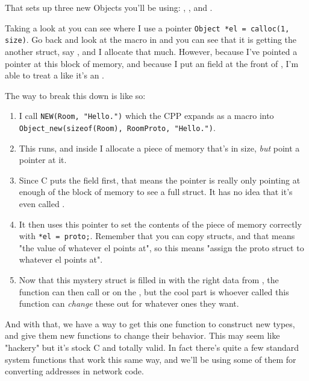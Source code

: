 That sets up three new Objects you'll be using: , ,
and .

Taking a look at  you can see where I use a pointer
\verb|Object *el = calloc(1, size)|.  Go back and look at the 
macro in  and you can see that it is getting the 
another struct, say , and I allocate that much.  However, because
I've pointed a  pointer at this block of memory, and because
I put an  field at the front of , I'm able
to treat a  like it's an .

The way to break this down is like so:

\begin{enumerate}
\item I call \verb|NEW(Room, "Hello.")| which the CPP expands as a macro
    into \verb|Object_new(sizeof(Room), RoomProto, "Hello.")|.
\item This runs, and inside  I allocate a piece of memory
    that's  in size, \emph{but} point a  pointer
    at it.
\item Since C puts the  field first, that means the 
    pointer is really only pointing at enough of the block of memory to
    see a full  struct.  It has no idea that it's even called
    .
\item It then uses this  pointer to set the contents of
    the piece of memory correctly with \verb|*el = proto;|.  Remember that
    you can copy structs, and that  means "the value of whatever el points
    at", so this means "assign the proto struct to whatever el points at".
\item Now that this mystery struct is filled in with the right data from
    , the function can then call  or 
    on the , but the cool part is whoever called this function
    can \emph{change} these out for whatever ones they want.
\end{enumerate}

And with that, we have a way to get this one function to construct new types,
and give them new functions to change their behavior.  This may seem like
"hackery" but it's stock C and totally valid.  In fact there's quite a few
standard system functions that work this same way, and we'll be using some of
them for converting addresses in network code.

